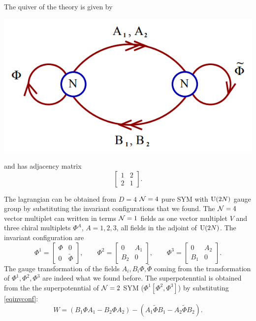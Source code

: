         The quiver of the theory is given by
        \begin{center}
            \includegraphics[scale=0.35]{Pictures/A1quiver.png}
        \end{center}
        and has adjacency matrix
        \begin{equation}
            \begin{bmatrix}
                1 & 2 \\
                2 & 1
            \end{bmatrix}.  
        \end{equation}

        The lagrangian can be obtained from $D=4$ $\mathcal{N}=4$ pure SYM with $\text{U}(2N)$ gauge group by substituting the invariant configurations that we found. The $\mathcal{N}=4$ vector multiplet can written in terms $\mathcal{N}=1$ fields as one vector multiplet $V$ and three chiral multiplets $\Phi^A$, $A=1,2,3$, all fields in the adjoint of $\text{U}(2N)$. The invariant configuration are
        \begin{equation}
            \Phi^1=
            \begin{bmatrix}
                \Phi & 0 \\
                0 & \tilde{\Phi}
            \end{bmatrix},\qquad
            \Phi^2=
            \begin{bmatrix}
                0 & A_1 \\
                B_2 & 0
            \end{bmatrix},\qquad
            \Phi^3=
            \begin{bmatrix}
                0 & A_2 \\
                B_1 & 0
            \end{bmatrix}.\label{eqinvconf}
        \end{equation}
        The gauge transformation of the fields $A_i,B_i\Phi,\tilde{\Phi}$ coming from the transformation of $\Phi^1,\Phi^2,\Phi^3$ are indeed what we found before. The superpotenntial is obtained from the the superpotenntial of $\mathcal{N}=2$ SYM ($\Phi^1[\Phi^2,\Phi^3]$) by substituting \eqref{eqinvconf}:
        \begin{equation}
            W=(B_1\Phi A_1-B_2\Phi A_2)-(A_1\tilde{\Phi}B_1-A_2\tilde{\Phi}B_2).
        \end{equation}

